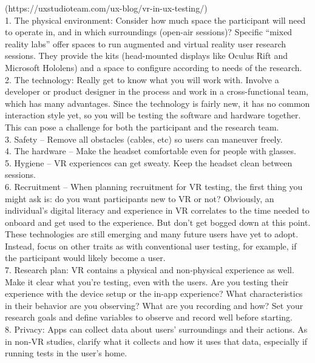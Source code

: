      (https://uxstudioteam.com/ux-blog/vr-in-ux-testing/)\\
      1. The physical environment: Consider how much space the participant will need to operate in, and in which surroundings (open-air sessions)? Specific “mixed reality labs” offer spaces to run augmented and virtual reality user research sessions. They provide the kits (head-mounted displays like Oculus Rift and Microsoft Hololens) and a space to configure according to needs of the research.\\
    2. The technology: Really get to know what you will work with. Involve a developer or product designer in the process and work in a cross-functional team, which has many advantages. Since the technology is fairly new, it has no common interaction style yet, so you will be testing the software and hardware together. This can pose a challenge for both the participant and the research team.\\
    3. Safety – Remove all obstacles (cables, etc) so users can maneuver freely. \\
    4. The hardware – Make the headset comfortable even for people with glasses.\\ 5. Hygiene – VR experiences can get sweaty. Keep the headset clean between sessions.\\
    6. Recruitment – When planning recruitment for VR testing, the first thing you might ask is: do you want participants new to VR or not? Obviously, an individual’s digital literacy and experience in VR correlates to the time needed to onboard and get used to the experience. But don’t get bogged down at this point. These technologies are still emerging and many future users have yet to adopt. Instead, focus on other traits as with conventional user testing, for example, if the participant would likely become a user.\\
    7. Research plan: VR contains a physical and non-physical experience as well. Make it clear what you’re testing, even with the users. Are you testing their experience with the device setup or the in-app experience? What characteristics in their behavior are you observing? What are you recording and how? Set your research goals and define variables to observe and record well before starting.\\
    8. Privacy: Apps can collect data about users’ surroundings and their actions. As in non-VR studies, clarify what it collects and how it uses that data, especially if running tests in the user’s home.\\
    
